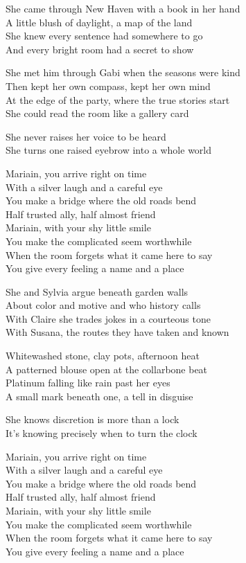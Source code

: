 \begin{lyrics}
She came through New Haven with a book in her hand\\
A little blush of daylight, a map of the land\\
She knew every sentence had somewhere to go\\
And every bright room had a secret to show

She met him through Gabi when the seasons were kind\\
Then kept her own compass, kept her own mind\\
At the edge of the party, where the true stories start\\
She could read the room like a gallery card

She never raises her voice to be heard\\
She turns one raised eyebrow into a whole world

Mariain, you arrive right on time\\
With a silver laugh and a careful eye\\
You make a bridge where the old roads bend\\
Half trusted ally, half almost friend\\
Mariain, with your shy little smile\\
You make the complicated seem worthwhile\\
When the room forgets what it came here to say\\
You give every feeling a name and a place

She and Sylvia argue beneath garden walls\\
About color and motive and who history calls\\
With Claire she trades jokes in a courteous tone\\
With Susana, the routes they have taken and known

Whitewashed stone, clay pots, afternoon heat\\
A patterned blouse open at the collarbone beat\\
Platinum falling like rain past her eyes\\
A small mark beneath one, a tell in disguise

She knows discretion is more than a lock\\
It’s knowing precisely when to turn the clock

Mariain, you arrive right on time\\
With a silver laugh and a careful eye\\
You make a bridge where the old roads bend\\
Half trusted ally, half almost friend\\
Mariain, with your shy little smile\\
You make the complicated seem worthwhile\\
When the room forgets what it came here to say\\
You give every feeling a name and a place


\end{lyrics}
